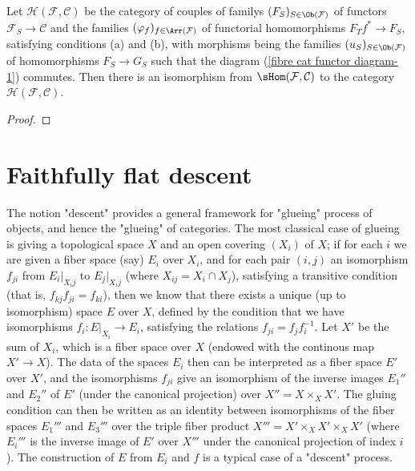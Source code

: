 \begin{proposition}\label{fibre cat functor to cat char by fiber}
Let $\mathcal{H}(\mathcal{F},\mathcal{C})$ be the category of couples of familys $(F_S)_{S\in\Ob(\mathcal{F})}$ of functors $\mathcal{F}_S\to \mathcal{C}$ and the families $(\varphi_f)_{f\in\Arr(\mathcal{F})}$ of functorial homomorphisms $F_Tf^*\to F_S$, satisfying conditions (a) and (b), with morphisms being the families $(u_S)_{S\in\Ob(\mathcal{F})}$ of homomorphisms $F_S\to G_S$ such that the diagram (\ref{fibre cat functor diagram-1}) commutes. Then there is an isomorphism from $\sHom(\mathcal{F},\mathcal{C})$ to the category $\mathcal{H}(\mathcal{F},\mathcal{C})$.
\end{proposition}
\begin{proof}

\end{proof}
\section{Faithfully flat descent}
The notion "descent" provides a general framework for "glueing" process of objects, and hence the "glueing" of categories. The most classical case of glueing is giving a topological space $X$ and an open covering $(X_i)$ of $X$; if for each $i$ we are given a fiber space (say) $E_i$ over $X_i$, and for each pair $(i,j)$ an isomorphism $f_{ji}$ from $E_i|_{X_ij}$ to $E_j|_{X_ij}$ (where $X_{ij}=X_i\cap X_j$), satisfying a transitive condition (that is, $f_{kj}f_{ji}=f_{ki}$), then we know that there exists a unique (up to isomorphism) space $E$ over $X$, defined by the condition that we have isomorphisms $f_i:E|_{X_i}\to E_i$, satisfying the relations $f_{ji}=f_jf_i^{-1}$. Let $X'$ be the sum of $X_i$, which is a fiber space over $X$ (endowed with the continous map $X'\to X$). The data of the spaces $E_i$ then can be interpreted as a fiber space $E'$ over $X'$, and the isomorphisms $f_{ji}$ give an isomorphism of the inverse images $E_1''$ and $E_2''$ of $E'$ (under the canonical projection) over $X''=X\times_XX'$. The gluing condition can then be written as an identity between isomorphisms of the fiber spaces $E_1'''$ and $E_3'''$ over the triple fiber product $X'''=X'\times_XX'\times_XX'$ (where $E_i'''$ is the inverse image of $E'$ over $X'''$ under the canonical projection of index $i$). The construction of $E$ from $E_i$ and $f$ is a typical case of a "descent" process.
